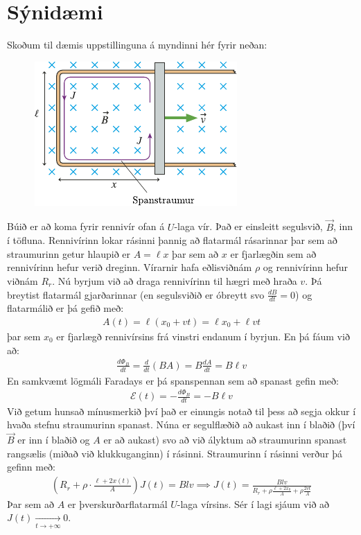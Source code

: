 \newpage

\section{Sýnidæmi}

Skoðum til dæmis uppstillinguna á myndinni hér fyrir neðan:

\begin{figure}[H]
    \centering
    \includegraphics{figures/rk3026.pdf}
\end{figure}

Búið er að koma fyrir rennivír ofan á $U$-laga vír. Það er einsleitt segulsvið, $\vec{B}$, inn í töfluna. Rennivírinn lokar rásinni þannig að flatarmál rásarinnar þar sem að straumurinn getur hlaupið er $A = \ell x$ þar sem að $x$ er fjarlægðin sem að rennivírinn hefur verið dreginn. Vírarnir hafa eðlisviðnám $\rho$ og rennivírinn hefur viðnám $R_r$. Nú byrjum við að draga rennivírinn til hægri með hraða $v$. Þá breytist flatarmál gjarðarinnar (en segulsviðið er óbreytt svo $\frac{dB}{dt} = 0$) og flatarmálið er þá gefið með:
\begin{align*}
    A(t) = \ell (x_0 + vt) = \ell x_0 + \ell vt
\end{align*}
þar sem $x_0$ er fjarlægð rennivírsins frá vinstri endanum í byrjun. En þá fáum við að:
\begin{align*}
    \frac{d \Phi_B}{dt} = \frac{d}{dt}\left( BA \right) = B \frac{dA}{dt} = B\ell v
\end{align*}
En samkvæmt lögmáli Faradays er þá spanspennan sem að spanast gefin með:
\begin{align*}
    \mathcal{E}(t) = - \frac{d\Phi_B}{dt} = - B\ell v
\end{align*}
Við getum hunsað mínusmerkið því það er einungis notað til þess að segja okkur í hvaða stefnu straumurinn spanast. Núna er segulflæðið að aukast inn í blaðið (því $\vec{B}$ er inn í blaðið og $A$ er að aukast) svo að við ályktum að straumurinn spanast rangsælis (miðað við klukkuganginn) í rásinni. Straumurinn í rásinni verður þá gefinn með:
\begin{align*}
    \left(R_r + \rho \cdot \frac{\ell + 2x(t)}{A}\right)J(t) = Blv \implies J(t) = \frac{Blv}{R_r + \rho \frac{\ell + 2x_0}{A} + \rho \frac{2vt}{A}}
\end{align*}
Þar sem að $A$ er þverskurðarflatarmál $U$-laga vírsins. Sér í lagi sjáum við að $J(t) \xrightarrow[t \to +\infty] \ 0$. \\

